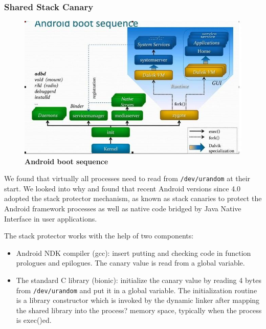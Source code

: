 \subsubsection{Shared Stack Canary}


\begin{figure}[t]
\begin{center}
\includegraphics[natwidth=640mm,natheight=392,scale=.3]{bootseq.png}
\end{center}
\caption{{\bf Android boot sequence}} 
\label{figzygote}
\end{figure}



We found that virtually all processes need to read from \verb|/dev/urandom| at their start. We looked into why and found that recent Android versions since 4.0 adopted the stack protector mechanism, as known as stack canaries to protect the Android framework processes as well as native code bridged by Java Native Interface in user applications.

The stack protector works with the help of two components:
\begin{itemize}

\item Android NDK compiler (gcc): insert putting and checking code in function prologues and epilogues. The canary value is read from a global variable.
\item The standard C library (bionic): initialize the canary value by reading 4 bytes from \verb|/dev/urandom| and put it in a global variable. The initialization routine is a library constructor which is invoked by the dynamic linker after mapping the shared library into the process? memory space, typically when the process is exec()ed.
\end{itemize}

